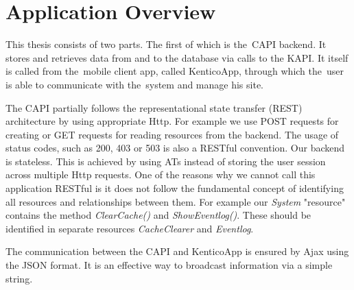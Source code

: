 \section{Application Overview}
This thesis consists of two parts. The first of which is the~CAPI backend. It stores and retrieves data from and to the database via calls to the KAPI. It itself is called from the~mobile client app, called KenticoApp, through which the~user is able to communicate with the~system and manage his site.

The CAPI partially follows the representational state transfer (REST) architecture by using appropriate Http. For example we use POST requests for creating or GET requests for reading resources from the backend. The usage of status codes, such as 200, 403 or 503 is also a RESTful convention. Our backend is stateless. This is achieved by using ATs instead of storing the user session across multiple Http requests. One of the reasons why we cannot call this application RESTful is it does not follow the fundamental concept of identifying all resources and relationships between them. For example our \textit{System} "resource" contains the method \textit{ClearCache()} and \textit{ShowEventlog()}. These should be identified in separate resources \textit{CacheClearer} and \textit{Eventlog}.

The communication between the CAPI and KenticoApp is ensured by Ajax using the JSON format. It is an effective way to broadcast information via a simple string.

